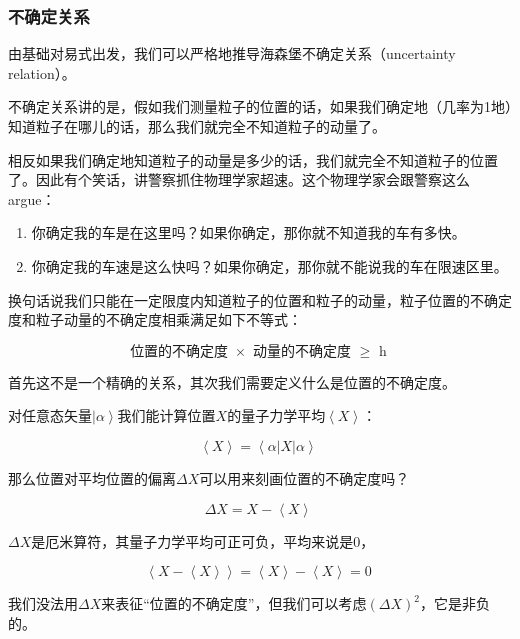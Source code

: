 \subsubsection{不确定关系}

由基础对易式出发，我们可以严格地推导海森堡不确定关系（uncertainty relation）。

不确定关系讲的是，假如我们测量粒子的位置的话，如果我们确定地（几率为1地）知道粒子在哪儿的话，那么我们就完全不知道粒子的动量了。

相反如果我们确定地知道粒子的动量是多少的话，我们就完全不知道粒子的位置了。因此有个笑话，讲警察抓住物理学家超速。这个物理学家会跟警察这么argue：

\begin{enumerate}
\item 

你确定我的车是在这里吗？如果你确定，那你就不知道我的车有多快。

\item

你确定我的车速是这么快吗？如果你确定，那你就不能说我的车在限速区里。

\end{enumerate}

换句话说我们只能在一定限度内知道粒子的位置和粒子的动量，粒子位置的不确定度和粒子动量的不确定度相乘满足如下不等式：

\begin{equation}
\text{位置的不确定度 $\times$ 动量的不确定度 $\ge $ h}~
\end{equation}

首先这不是一个精确的关系，其次我们需要定义什么是位置的不确定度。

对任意态矢量$\left| \alpha \right\rangle$我们能计算位置$X$的量子力学平均$\left\langle X \right\rangle$：

\begin{equation}
\left\langle X \right\rangle = \left\langle \alpha \right| X \left| \alpha \right\rangle~
\end{equation}

那么位置对平均位置的偏离$\Delta X$可以用来刻画位置的不确定度吗？

\begin{equation}
\Delta X = X  -  \left\langle X \right\rangle~
\end{equation}

$\Delta X$是厄米算符，其量子力学平均可正可负，平均来说是0，

\begin{equation}
\left\langle X -  \left\langle X \right\rangle \right\rangle = \left\langle X \right\rangle - \left\langle X \right\rangle = 0~
\end{equation}

我们没法用$\Delta X$来表征“位置的不确定度”，但我们可以考虑$\left( \Delta X  \right)^2 $，它是非负的。
